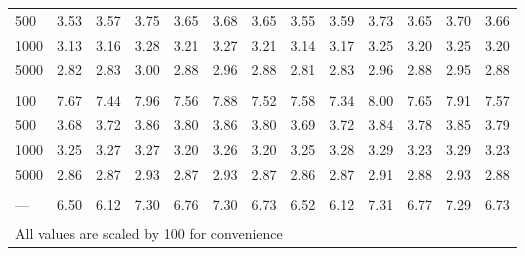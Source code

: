 \documentclass[AMA,STIX1COL,doublespace]{WileyNJD-v2}
\begin{document}
\begin{table}
\begin{tabular}[t]{lcccccccccccc}
\hspace{1em}500 & 3.53 & 3.57 & 3.75 & 3.65 & 3.68 & 3.65 & 3.55 & 3.59 & 3.73 & 3.65 & 3.70 & 3.66\\
\hspace{1em}1000 & 3.13 & 3.16 & 3.28 & 3.21 & 3.27 & 3.21 & 3.14 & 3.17 & 3.25 & 3.20 & 3.25 & 3.20\\
\hspace{1em}5000 & 2.82 & 2.83 & 3.00 & 2.88 & 2.96 & 2.88 & 2.81 & 2.83 & 2.96 & 2.88 & 2.95 & 2.88\\
\addlinespace[0.75em]
\multicolumn{13}{l}{\textbf{10 predictors, 490 junk}}\\
\hline
\hspace{1em}100 & 7.67 & 7.44 & 7.96 & 7.56 & 7.88 & 7.52 & 7.58 & 7.34 & 8.00 & 7.65 & 7.91 & 7.57\\
\hspace{1em}500 & 3.68 & 3.72 & 3.86 & 3.80 & 3.86 & 3.80 & 3.69 & 3.72 & 3.84 & 3.78 & 3.85 & 3.79\\
\hspace{1em}1000 & 3.25 & 3.27 & 3.27 & 3.20 & 3.26 & 3.20 & 3.25 & 3.28 & 3.29 & 3.23 & 3.29 & 3.23\\
\hspace{1em}5000 & 2.86 & 2.87 & 2.93 & 2.87 & 2.93 & 2.87 & 2.86 & 2.87 & 2.91 & 2.88 & 2.93 & 2.88\\
\addlinespace[0.75em]
\multicolumn{13}{l}{\textbf{Overall}}\\
\hline
\hspace{1em}--- & 6.50 & 6.12 & 7.30 & 6.76 & 7.30 & 6.73 & 6.52 & 6.12 & 7.31 & 6.77 & 7.29 & 6.73\\
\bottomrule
\multicolumn{13}{l}{\textsuperscript{} All values are scaled by 100 for convenience}\\
\end{tabular}
\end{table}
\end{document}
